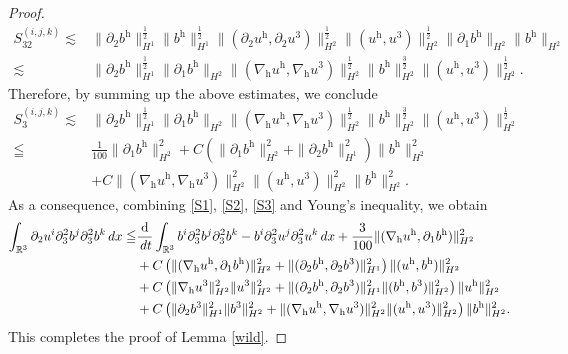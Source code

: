 \documentclass[10pt,a4paper]{amsart}
\newcommand{\R}{\mathbb{R}}
\newcommand{\dt}{\,{\rm d}t}
\newcommand{\dx}{\,{\rm d}x}
\newcommand{\h}{\mathrm{h}}
\newcommand{\nablah}{\nabla_{\mathrm{h}}}
\begin{document}
\begin{proof}
	\begin{align*}
		S^{(i,j,k)}_{32}\lesssim&\|\partial_2b^\h\|_{H^1}^\frac12\|b^\h\|_{H^1}^\frac12\|(\partial_2u^\h,\partial_2u^3)\|_{H^2}^\frac12\|(u^\h,u^3)\|_{H^2}^\frac12\|\partial_1b^\h\|_{H^2}\|b^\h\|_{H^2}\\
		\lesssim&\|\partial_2b^\h\|_{H^1}^\frac12\|\partial_1b^\h\|_{H^2}\|(\nablah u^\h,\nablah u^3)\|_{H^2}^\frac12\|b^\h\|_{H^2}^\frac32\|(u^\h,u^3)\|_{H^2}^\frac12.
	\end{align*}
	Therefore, by summing up the above estimates, we conclude
	\begin{align}\label{S3}
		S^{(i,j,k)}_{3}\lesssim&\|\partial_2b^\h\|_{H^1}^\frac12\|\partial_1b^\h\|_{H^2}\|(\nablah u^\h,\nablah u^3)\|_{H^2}^\frac12\|b^\h\|_{H^2}^\frac32\|(u^\h,u^3)\|_{H^2}^\frac12\nonumber\\
		\leqq &\frac{1}{100}\|\partial_1b^\h\|_{H^2}^2+C\left(\|\partial_1b^\h\|_{H^2}^2+\|\partial_2b^\h\|_{H^1}^2\right)\|b^\h\|_{H^2}^2\nonumber\\
		&+C\|(\nablah u^\h,\nablah u^3)\|_{H^2}^2\|(u^\h,u^3)\|_{H^2}^2\|b^\h\|_{H^2}^2.
	\end{align}
	As a consequence, combining \eqref{S1}, \eqref{S2}, \eqref{S3} and Young's inequality, we obtain
	\begin{align*}
		\int_{\R^3}\partial_2u^i\partial_3^2b^j\partial_3^2b^k\dx \leqq&\frac{\mathrm{d}}{\dt}\int_{\R^3} b^i\partial_3^2b^j\partial_3^2b^k-b^i\partial_3^2u^j\partial_3^2u^k\dx+\frac{3}{100}\|(\nablah u^\h,\partial_1b^\h)\|_{H^2}^2\nonumber\\
		&+C\left(\|(\nablah u^\h,\partial_1b^\h)\|_{H^2}^2+\|(\partial_2b^\h,\partial_2b^3)\|_{H^1}^2\right)\|(u^\h,b^\h)\|_{H^2}^2\nonumber\\
		&+C\left(\|\nablah u^3\|_{H^2}^2\|u^3\|_{H^2}^2+ \|(\partial_2b^\h,\partial_2b^3)\|_{H^1}^2\|(b^\h,b^3)\|_{H^2}^2\right)\|u^\h\|_{H^2}^2\\	&+C\left(\|\partial_2b^3\|_{H^1}^2\|b^3\|_{H^2}^2+\|(\nablah u^\h,\nablah u^3)\|_{H^2}^2\|(u^\h,u^3)\|_{H^2}^2\right)\|b^\h\|_{H^2}^2.
	\end{align*}
	This completes the proof of Lemma \ref{wild}.
\end{proof}
\end{document}
